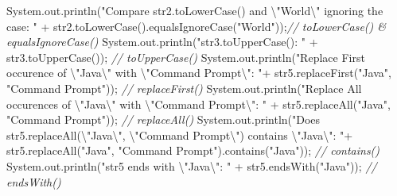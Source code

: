 \documentclass[
  12pt,
]{article}
\newenvironment{Shaded}{}{}
\newcommand{\BuiltInTok}[1]{\textcolor[rgb]{0.00,0.50,0.00}{#1}}
\newcommand{\CommentTok}[1]{\textcolor[rgb]{0.38,0.63,0.69}{\textit{#1}}}
\newcommand{\FunctionTok}[1]{\textcolor[rgb]{0.02,0.16,0.49}{#1}}
\newcommand{\NormalTok}[1]{#1}
\newcommand{\OperatorTok}[1]{\textcolor[rgb]{0.40,0.40,0.40}{#1}}
\newcommand{\SpecialCharTok}[1]{\textcolor[rgb]{0.25,0.44,0.63}{#1}}
\newcommand{\StringTok}[1]{\textcolor[rgb]{0.25,0.44,0.63}{#1}}
\begin{document}
\begin{Shaded}
\begin{Highlighting}[numbers=left,,]
        \BuiltInTok{System}\OperatorTok{.}\FunctionTok{out}\OperatorTok{.}\FunctionTok{println}\OperatorTok{(}\StringTok{"Compare str2.toLowerCase() and }\SpecialCharTok{\textbackslash{}"}\StringTok{World}\SpecialCharTok{\textbackslash{}"}\StringTok{ ignoring the case: "} \OperatorTok{+}\NormalTok{ str2}\OperatorTok{.}\FunctionTok{toLowerCase}\OperatorTok{().}\FunctionTok{equalsIgnoreCase}\OperatorTok{(}\StringTok{"World"}\OperatorTok{));}\CommentTok{// toLowerCase() \& equalsIgnoreCase()}
        \BuiltInTok{System}\OperatorTok{.}\FunctionTok{out}\OperatorTok{.}\FunctionTok{println}\OperatorTok{(}\StringTok{"str3.toUpperCase(): "} \OperatorTok{+}\NormalTok{ str3}\OperatorTok{.}\FunctionTok{toUpperCase}\OperatorTok{());} \CommentTok{// toUpperCase()}
        \BuiltInTok{System}\OperatorTok{.}\FunctionTok{out}\OperatorTok{.}\FunctionTok{println}\OperatorTok{(}\StringTok{"Replace First occurence of }\SpecialCharTok{\textbackslash{}"}\StringTok{Java}\SpecialCharTok{\textbackslash{}"}\StringTok{ with }\SpecialCharTok{\textbackslash{}"}\StringTok{Command Prompt}\SpecialCharTok{\textbackslash{}"}\StringTok{: "}\OperatorTok{+}\NormalTok{ str5}\OperatorTok{.}\FunctionTok{replaceFirst}\OperatorTok{(}\StringTok{"Java"}\OperatorTok{,} \StringTok{"Command Prompt"}\OperatorTok{));} \CommentTok{// replaceFirst()}
        \BuiltInTok{System}\OperatorTok{.}\FunctionTok{out}\OperatorTok{.}\FunctionTok{println}\OperatorTok{(}\StringTok{"Replace All occurences of }\SpecialCharTok{\textbackslash{}"}\StringTok{Java}\SpecialCharTok{\textbackslash{}"}\StringTok{ with }\SpecialCharTok{\textbackslash{}"}\StringTok{Command Prompt}\SpecialCharTok{\textbackslash{}"}\StringTok{: "} \OperatorTok{+}\NormalTok{ str5}\OperatorTok{.}\FunctionTok{replaceAll}\OperatorTok{(}\StringTok{"Java"}\OperatorTok{,} \StringTok{"Command Prompt"}\OperatorTok{));} \CommentTok{// replaceAll()}
        \BuiltInTok{System}\OperatorTok{.}\FunctionTok{out}\OperatorTok{.}\FunctionTok{println}\OperatorTok{(}\StringTok{"Does str5.replaceAll(}\SpecialCharTok{\textbackslash{}"}\StringTok{Java}\SpecialCharTok{\textbackslash{}"}\StringTok{, }\SpecialCharTok{\textbackslash{}"}\StringTok{Command Prompt}\SpecialCharTok{\textbackslash{}"}\StringTok{) contains }\SpecialCharTok{\textbackslash{}"}\StringTok{Java}\SpecialCharTok{\textbackslash{}"}\StringTok{: "}\OperatorTok{+}\NormalTok{ str5}\OperatorTok{.}\FunctionTok{replaceAll}\OperatorTok{(}\StringTok{"Java"}\OperatorTok{,} \StringTok{"Command Prompt"}\OperatorTok{).}\FunctionTok{contains}\OperatorTok{(}\StringTok{"Java"}\OperatorTok{));} \CommentTok{// contains()}
        \BuiltInTok{System}\OperatorTok{.}\FunctionTok{out}\OperatorTok{.}\FunctionTok{println}\OperatorTok{(}\StringTok{"str5 ends with }\SpecialCharTok{\textbackslash{}"}\StringTok{Java}\SpecialCharTok{\textbackslash{}"}\StringTok{: "} \OperatorTok{+}\NormalTok{ str5}\OperatorTok{.}\FunctionTok{endsWith}\OperatorTok{(}\StringTok{"Java"}\OperatorTok{));} \CommentTok{// endsWith()}

\end{Highlighting}
\end{Shaded}
\end{document}
